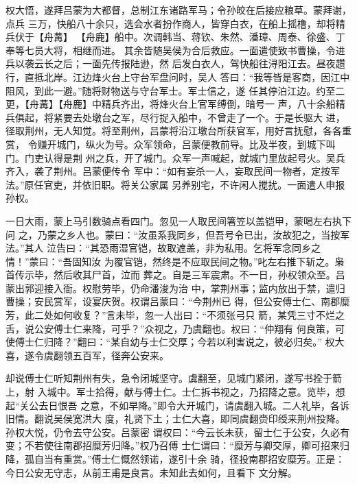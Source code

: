 权大悟，遂拜吕蒙为大都督，总制江东诸路军马；令孙皎在后接应粮草。蒙拜谢，点兵
三万，快船八十余只，选会水者扮作商人，皆穿白衣，在船上摇橹，却将精兵伏于【舟冓】
【舟鹿】船中。次调韩当、蒋钦、朱然、潘璋、周泰、徐盛、丁奉等七员大将，相继而进。
其余皆随吴侯为合后救应。一面遣使致书曹操，令进兵以袭云长之后；一面先传报陆逊，然
后发白衣人，驾快船往浔阳江去。昼夜趱行，直抵北岸。江边烽火台上守台军盘问时，吴人
答曰：“我等皆是客商，因江中阻风，到此一避。”随将财物送与守台军士。军士信之，遂
任其停泊江边。约至二更，【舟冓】【舟鹿】中精兵齐出，将烽火台上官军缚倒，暗号一
声，八十余船精兵俱起，将紧要去处墩台之军，尽行捉入船中，不曾走了一个。于是长驱大
进，径取荆州，无人知觉。将至荆州，吕蒙将沿江墩台所获官军，用好言抚慰，各各重赏，
令赚开城门，纵火为号。众军领命，吕蒙便教前导。比及半夜，到城下叫门。门吏认得是荆
州之兵，开了城门。众军一声喊起，就城门里放起号火。吴兵齐入，袭了荆州。吕蒙便传令
军中：“如有妄杀一人，妄取民间一物者，定按军法。”原任官吏，并依旧职。将关公家属
另养别宅，不许闲人搅扰。一面遣人申报孙权。

一日大雨，蒙上马引数骑点看四门。忽见一人取民间箸笠以盖铠甲，蒙喝左右执下问
之，乃蒙之乡人也。蒙曰：“汝虽系我同乡，但吾号令已出，汝故犯之，当按军法。”其人
泣告曰：“其恐雨湿官铠，故取遮盖，非为私用。乞将军念同乡之情！”蒙曰：“吾固知汝
为覆官铠，然终是不应取民间之物。”叱左右推下斩之。枭首传示毕，然后收其尸首，泣而
葬之。自是三军震肃。不一日，孙权领众至。吕蒙出郭迎接入衙。权慰劳毕，仍命潘浚为治
中，掌荆州事；监内放出于禁，遣归曹操；安民赏军，设宴庆贺。权谓吕蒙曰：“今荆州已
得，但公安傅士仁、南郡糜芳，此二处如何收复？”言未毕，忽一人出曰：“不须张弓只
箭，某凭三寸不烂之舌，说公安傅士仁来降，可乎？”众视之，乃虞翻也。权曰：“仲翔有
何良策，可使傅士仁归降？”翻曰：“某自幼与士仁交厚；今若以利害说之，彼必归矣。”
权大喜，遂令虞翻领五百军，径奔公安来。

却说傅士仁听知荆州有失，急令闭城坚守。虞翻至，见城门紧闭，遂写书拴于箭上，射
入城中。军士拾得，献与傅士仁。士仁拆书视之，乃招降之意。览毕，想起“关公去日恨吾
之意，不如早降。”即令大开城门，请虞翻入城。二人礼毕，各诉旧情。翻说吴侯宽洪大
度，礼贤下土；士仁大喜，即同虞翻赍印绶来荆州投降。孙权大悦，仍令去守公安。吕蒙密
谓权曰：“今云长未获，留士仁于公安，久必有变；不若使往南郡招糜芳归降。”权乃召傅
士仁谓曰：“糜芳与卿交厚，卿可招来归降，孤自当有重赏。”傅士仁慨然领诺，遂引十余
骑，径投南郡招安糜芳。正是：今日公安无守志，从前王甫是良言。未知此去如何，且看下
文分解。